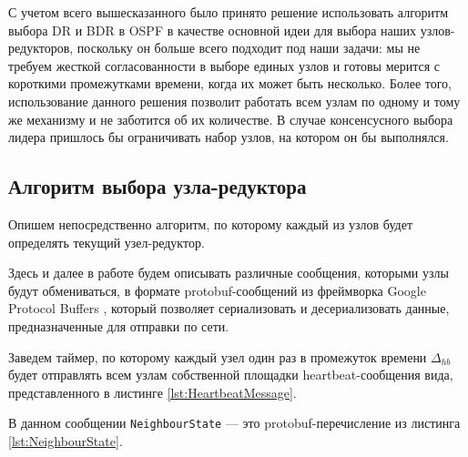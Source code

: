 \documentclass{article}
\theoremstyle{plain}
\theoremstyle{plain}
\theoremstyle{plain}
\theoremstyle{plain}
\theoremstyle{definition}
\theoremstyle{remark}
\theoremstyle{plain}
\begin{document}
С учетом всего вышесказанного было принято решение использовать алгоритм выбора DR и BDR в OSPF в качестве основной идеи для выбора наших узлов-редукторов, поскольку он больше всего подходит под наши задачи: мы не требуем жесткой согласованности в выборе единых узлов и готовы мерится с короткими промежутками времени, когда их может быть несколько. Более того, использование данного решения позволит работать всем узлам по одному и тому же механизму и не заботится об их количестве. В случае консенсусного выбора лидера пришлось бы ограничивать набор узлов, на котором он бы выполнялся.

\subsection{Алгоритм выбора узла-редуктора}
\label{ReducersElectionSubsection}

Опишем непосредственно алгоритм, по которому каждый из узлов будет определять текущий узел-редуктор.

Здесь и далее в работе будем описывать различные сообщения, которыми узлы будут обмениваться, в формате protobuf-сообщений из фреймворка Google Protocol Buffers \cite{Google_protobuf}, который позволяет сериализовать и десериализовать данные, предназначенные для отправки по сети.

Заведем таймер, по которому каждый узел один раз в промежуток времени $\Delta_{hb}$ будет отправлять всем узлам собственной площадки heartbeat-сообщения вида, представленного в листинге \ref{lst:HeartbeatMessage}.


В данном сообщении \texttt{NeighbourState} --- это protobuf-перечисление из листинга \ref{lst:NeighbourState}.

\end{document}
